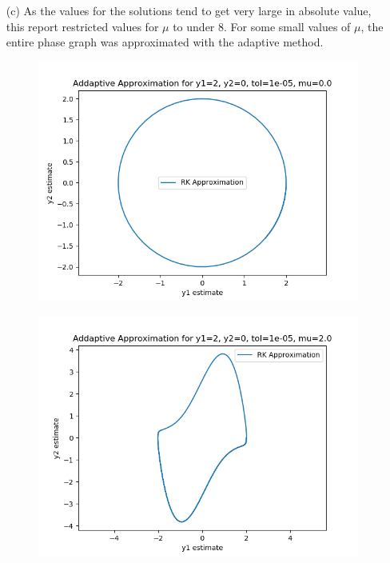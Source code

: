\documentclass{article}
\begin{document}
\begin{itemize}
	\item[(c)]
		As the values for the solutions tend to get very large in
		absolute value, this report restricted values for $\mu$ to under
		$8$. For some small values of $\mu$, the entire phase graph was
		approximated with the adaptive method.
		\begin{figure}[H]
			\includegraphics[scale=0.6]{adapt_vdp0}
		\end{figure}
		\begin{figure}[H]
			\includegraphics[scale=0.6]{adapt_vdp2}
		\end{figure}
		\begin{figure}[H]

\end{figure}
\end{itemize}
\end{document}
